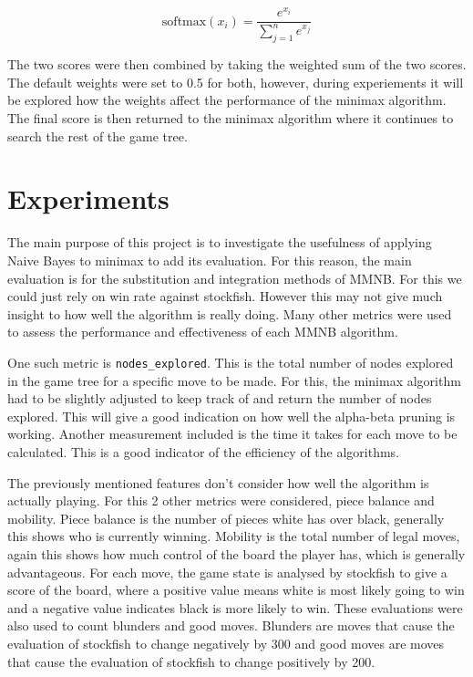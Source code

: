 \begin{equation}
    \label{eq:softmax}
    \text{softmax}(x_i) = \frac{e^{x_i}}{\sum_{j=1}^{n} e^{x_j}}
\end{equation}


The two scores were then combined by taking the weighted sum of the two scores. The default weights were set to 0.5 for both, however, during experiements it will be explored how the weights affect the performance of the minimax algorithm. The final score is then returned to the minimax algorithm where it continues to search the rest of the game tree.


\section{Experiments}

The main purpose of this project is to investigate the usefulness of applying Naive Bayes to minimax to add its evaluation. For this reason, the main evaluation is for the substitution and integration methods of MMNB. For this we could just rely on win rate against stockfish. However this may not give much insight to how well the algorithm is really doing. Many other metrics were used to assess the performance and effectiveness of each MMNB algorithm. 

One such metric is \texttt{nodes\_explored}. This is the total number of nodes explored in the game tree for a specific move to be made. For this, the minimax algorithm had to be slightly adjusted to keep track of and return the number of nodes explored. This will give a good indication on how well the alpha-beta pruning is working. Another measurement included is the time it takes for each move to be calculated. This is a good indicator of the efficiency of the algorithms. 

The previously mentioned features don't consider how well the algorithm is actually playing. For this 2 other metrics were considered, piece balance and mobility. Piece balance is the number of pieces white has over black, generally this shows who is currently winning. Mobility is the total number of legal moves, again this shows how much control of the board the player has, which is generally advantageous. For each move, the game state is analysed by stockfish to give a score of the board, where a positive value means white is most likely going to win and a negative value indicates black is more likely to win. These evaluations were also used to count blunders and good moves. Blunders are moves that cause the evaluation of stockfish to change negatively by 300 and good moves are moves that cause the evaluation of stockfish to change positively by 200.  


